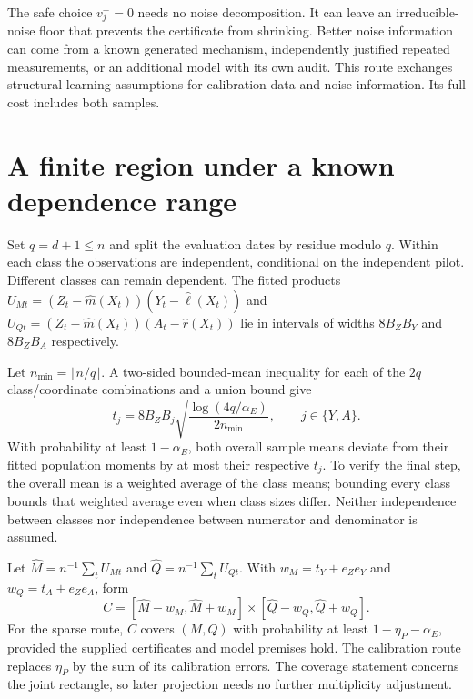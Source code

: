 The safe choice $v_j^-=0$ needs no noise decomposition. It can leave an
irreducible-noise floor that prevents the certificate from shrinking. Better
noise information can come from a known generated mechanism, independently
justified repeated measurements, or an additional model with its own audit.
This route exchanges structural learning assumptions for calibration data and
noise information. Its full cost includes both samples.

\section{A finite region under a known dependence range}

Set $q=d+1\le n$ and split the evaluation dates by residue modulo $q$. Within
each class the observations are independent, conditional on the independent
pilot. Different classes can remain dependent. The fitted products
$U_{Mt}=(Z_t-\widehat m(X_t))(Y_t-\widehat\ell(X_t))$ and
$U_{Qt}=(Z_t-\widehat m(X_t))(A_t-\widehat r(X_t))$ lie in intervals of
widths $8B_ZB_Y$ and $8B_ZB_A$ respectively.

Let $n_{\min}=\lfloor n/q\rfloor$. A two-sided bounded-mean inequality for
each of the $2q$ class/coordinate combinations and a union bound give
\begin{equation}
 t_j=8B_ZB_j
 \sqrt{\frac{\log(4q/\alpha_E)}{2n_{\min}}},
 \qquad j\in\{Y,A\}.
 \label{exec13:pilot-temporal-band}
\end{equation}
With probability at least $1-\alpha_E$, both overall sample means deviate from
their fitted population moments by at most their respective $t_j$. To verify
the final step, the overall mean is a weighted average of the class means;
bounding every class bounds that weighted average even when class sizes differ.
Neither independence between classes nor independence between numerator and
denominator is assumed.

Let $\widehat M=n^{-1}\sum_tU_{Mt}$ and
$\widehat Q=n^{-1}\sum_tU_{Qt}$. With
$w_M=t_Y+e_Ze_Y$ and $w_Q=t_A+e_Ze_A$, form
\begin{equation}
 C=[\widehat M-w_M,\widehat M+w_M]
   \mathbin\times[\widehat Q-w_Q,\widehat Q+w_Q].
 \label{exec13:pilot-rectangle}
\end{equation}
For the sparse route, $C$ covers $(M,Q)$ with probability at least
$1-\eta_P-\alpha_E$, provided the supplied certificates and model premises
hold. The calibration route replaces $\eta_P$ by the sum of its calibration
errors. The coverage statement concerns the joint rectangle, so later projection
needs no further multiplicity adjustment.

